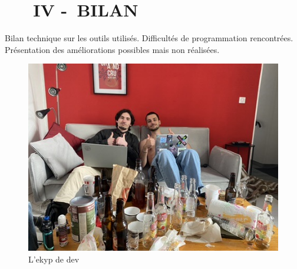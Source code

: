 \chapter[~~~BILAN]{~~~IV -~BILAN}%
\label{cls}

Bilan technique sur les outils utilisés. Difficultés de programmation rencontrées. Présentation des améliorations possibles mais non réalisées.




\begin{figure}[!ht]
    \centering%
    \includegraphics[width=15.5cm]{assets/pictures/FA9F88F7-EF79-42C3-90B1-35315309BABB_4_5005_c.jpeg} 
    \caption{L'ekyp de dev}%
  \end{figure}
  \bigskip
\newpage
